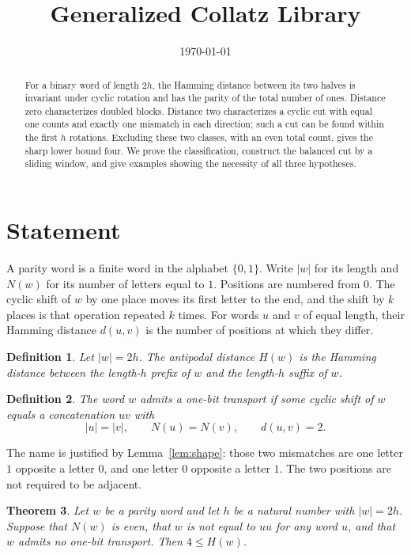 \documentclass[11pt,letterpaper]{article}
\title{Generalized Collatz Library}
\author{}
\date{\today}
\newtheorem{theorem}{Theorem}
\newtheorem{definition}[theorem]{Definition}
\begin{document}
\maketitle

\begin{abstract}
For a binary word of length \(2h\), the Hamming distance between its two halves
is invariant under cyclic rotation and has the parity of the total number of
ones. Distance zero characterizes doubled blocks. Distance two characterizes
a cyclic cut with equal one counts and exactly one mismatch in each direction;
such a cut can be found within the first \(h\) rotations. Excluding these two
classes, with an even total count, gives the sharp lower bound four. We prove
the classification, construct the balanced cut by a sliding window, and give
examples showing the necessity of all three hypotheses.
\end{abstract}

\section{Statement}

A parity word is a finite word in the alphabet \(\{0,1\}\). Write \(|w|\) for its length and \(N(w)\) for its number of letters equal to \(1\). Positions are numbered from \(0\). The cyclic shift of \(w\) by one place moves its first letter to the end, and the shift by \(k\) places is that operation repeated \(k\) times. For words \(u\) and \(v\) of equal length, their Hamming distance \(d(u,v)\) is the number of positions at which they differ.

\begin{definition}
\label{def:antipodal}
Let \(|w|=2h\). The antipodal distance \(H(w)\) is the Hamming distance between the length-\(h\) prefix of \(w\) and the length-\(h\) suffix of \(w\).
\end{definition}

\begin{definition}
\label{def:transport}
The word \(w\) admits a one-bit transport if some cyclic shift of \(w\) equals a concatenation \(uv\) with
\[
|u|=|v|,\qquad N(u)=N(v),\qquad d(u,v)=2.
\]
\end{definition}

The name is justified by Lemma~\ref{lem:shape}: those two mismatches are one
letter \(1\) opposite a letter \(0\), and one letter \(0\) opposite a letter
\(1\). The two positions are not required to be adjacent.

\begin{theorem}
\label{thm:gap}
Let \(w\) be a parity word and let \(h\) be a natural number with \(|w|=2h\). Suppose that \(N(w)\) is even, that \(w\) is not equal to \(uu\) for any word \(u\), and that \(w\) admits no one-bit transport. Then \(4\le H(w)\).
\end{theorem}
\end{document}
